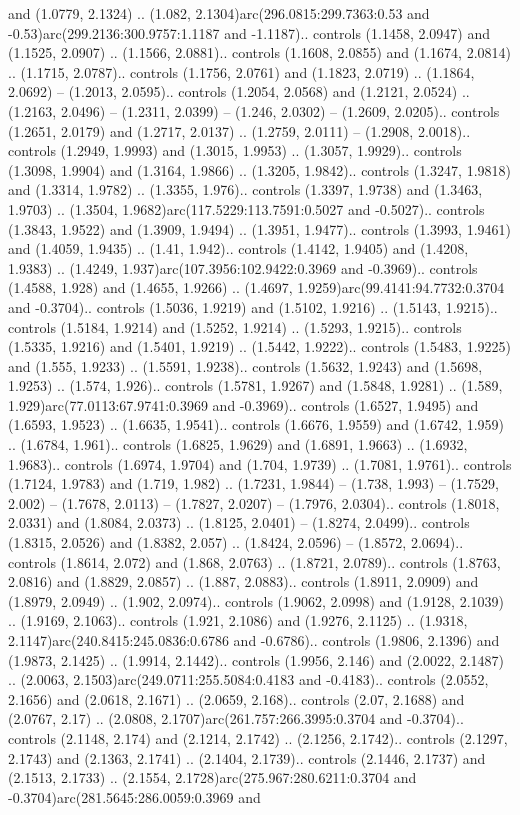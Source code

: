 and (1.0779, 2.1324) .. (1.082, 2.1304)arc(296.0815:299.7363:0.53 and -0.53)arc(299.2136:300.9757:1.1187 and -1.1187).. controls (1.1458, 2.0947) and (1.1525, 2.0907) .. (1.1566, 2.0881).. controls (1.1608, 2.0855) and (1.1674, 2.0814) .. (1.1715, 2.0787).. controls (1.1756, 2.0761) and (1.1823, 2.0719) .. (1.1864, 2.0692) -- (1.2013, 2.0595).. controls (1.2054, 2.0568) and (1.2121, 2.0524) .. (1.2163, 2.0496) -- (1.2311, 2.0399) -- (1.246, 2.0302) -- (1.2609, 2.0205).. controls (1.2651, 2.0179) and (1.2717, 2.0137) .. (1.2759, 2.0111) -- (1.2908, 2.0018).. controls (1.2949, 1.9993) and (1.3015, 1.9953) .. (1.3057, 1.9929).. controls (1.3098, 1.9904) and (1.3164, 1.9866) .. (1.3205, 1.9842).. controls (1.3247, 1.9818) and (1.3314, 1.9782) .. (1.3355, 1.976).. controls (1.3397, 1.9738) and (1.3463, 1.9703) .. (1.3504, 1.9682)arc(117.5229:113.7591:0.5027 and -0.5027).. controls (1.3843, 1.9522) and (1.3909, 1.9494) .. (1.3951, 1.9477).. controls (1.3993, 1.9461) and (1.4059, 1.9435) .. (1.41, 1.942).. controls (1.4142, 1.9405) and (1.4208, 1.9383) .. (1.4249, 1.937)arc(107.3956:102.9422:0.3969 and -0.3969).. controls (1.4588, 1.928) and (1.4655, 1.9266) .. (1.4697, 1.9259)arc(99.4141:94.7732:0.3704 and -0.3704).. controls (1.5036, 1.9219) and (1.5102, 1.9216) .. (1.5143, 1.9215).. controls (1.5184, 1.9214) and (1.5252, 1.9214) .. (1.5293, 1.9215).. controls (1.5335, 1.9216) and (1.5401, 1.9219) .. (1.5442, 1.9222).. controls (1.5483, 1.9225) and (1.555, 1.9233) .. (1.5591, 1.9238).. controls (1.5632, 1.9243) and (1.5698, 1.9253) .. (1.574, 1.926).. controls (1.5781, 1.9267) and (1.5848, 1.9281) .. (1.589, 1.929)arc(77.0113:67.9741:0.3969 and -0.3969).. controls (1.6527, 1.9495) and (1.6593, 1.9523) .. (1.6635, 1.9541).. controls (1.6676, 1.9559) and (1.6742, 1.959) .. (1.6784, 1.961).. controls (1.6825, 1.9629) and (1.6891, 1.9663) .. (1.6932, 1.9683).. controls (1.6974, 1.9704) and (1.704, 1.9739) .. (1.7081, 1.9761).. controls (1.7124, 1.9783) and (1.719, 1.982) .. (1.7231, 1.9844) -- (1.738, 1.993) -- (1.7529, 2.002) -- (1.7678, 2.0113) -- (1.7827, 2.0207) -- (1.7976, 2.0304).. controls (1.8018, 2.0331) and (1.8084, 2.0373) .. (1.8125, 2.0401) -- (1.8274, 2.0499).. controls (1.8315, 2.0526) and (1.8382, 2.057) .. (1.8424, 2.0596) -- (1.8572, 2.0694).. controls (1.8614, 2.072) and (1.868, 2.0763) .. (1.8721, 2.0789).. controls (1.8763, 2.0816) and (1.8829, 2.0857) .. (1.887, 2.0883).. controls (1.8911, 2.0909) and (1.8979, 2.0949) .. (1.902, 2.0974).. controls (1.9062, 2.0998) and (1.9128, 2.1039) .. (1.9169, 2.1063).. controls (1.921, 2.1086) and (1.9276, 2.1125) .. (1.9318, 2.1147)arc(240.8415:245.0836:0.6786 and -0.6786).. controls (1.9806, 2.1396) and (1.9873, 2.1425) .. (1.9914, 2.1442).. controls (1.9956, 2.146) and (2.0022, 2.1487) .. (2.0063, 2.1503)arc(249.0711:255.5084:0.4183 and -0.4183).. controls (2.0552, 2.1656) and (2.0618, 2.1671) .. (2.0659, 2.168).. controls (2.07, 2.1688) and (2.0767, 2.17) .. (2.0808, 2.1707)arc(261.757:266.3995:0.3704 and -0.3704).. controls (2.1148, 2.174) and (2.1214, 2.1742) .. (2.1256, 2.1742).. controls (2.1297, 2.1743) and (2.1363, 2.1741) .. (2.1404, 2.1739).. controls (2.1446, 2.1737) and (2.1513, 2.1733) .. (2.1554, 2.1728)arc(275.967:280.6211:0.3704 and -0.3704)arc(281.5645:286.0059:0.3969 and 